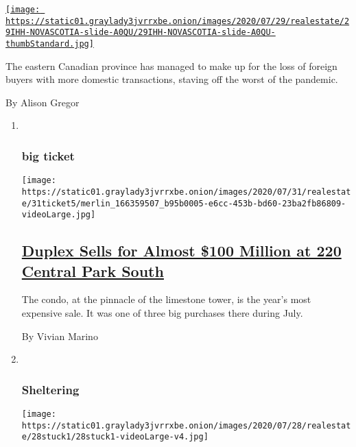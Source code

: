 \begin{enumerate}
\begin{enumerate}
    \href{/2020/07/29/realestate/house-hunting-in-nova-scotia-a-sprawling-seaside-villa-for-2-million.html}{\texttt{[image: https://static01.graylady3jvrrxbe.onion/images/2020/07/29/realestate/29IHH-NOVASCOTIA-slide-A0QU/29IHH-NOVASCOTIA-slide-A0QU-thumbStandard.jpg]}}

    The eastern Canadian province has managed to make up for the loss of
    foreign buyers with more domestic transactions, staving off the
    worst of the pandemic.

    By Alison Gregor
  \end{enumerate}
\end{enumerate}

\begin{enumerate}
\def\labelenumi{\arabic{enumi}.}
\item ~
  \hypertarget{big-ticket}{%
  \subsubsection{big ticket}\label{big-ticket}}

  \texttt{[image: https://static01.graylady3jvrrxbe.onion/images/2020/07/31/realestate/31ticket5/merlin\_166359507\_b95b0005-e6cc-453b-bd60-23ba2fb86809-videoLarge.jpg]}

  \hypertarget{duplex-sells-for-almost-100-million-at-220-central-park-south}{%
  \subsection{\texorpdfstring{\href{/2020/07/28/realestate/duplex-sells-for-almost-100-million-at-220-central-park-south.html}{Duplex
  Sells for Almost \$100 Million at 220 Central Park
  South}}{Duplex Sells for Almost \$100 Million at 220 Central Park South}}\label{duplex-sells-for-almost-100-million-at-220-central-park-south}}

  The condo, at the pinnacle of the limestone tower, is the year's most
  expensive sale. It was one of three big purchases there during July.

  By Vivian Marino
\item ~
  \hypertarget{sheltering}{%
  \subsubsection{Sheltering}\label{sheltering}}

  \texttt{[image: https://static01.graylady3jvrrxbe.onion/images/2020/07/28/realestate/28stuck1/28stuck1-videoLarge-v4.jpg]}


\end{enumerate}
